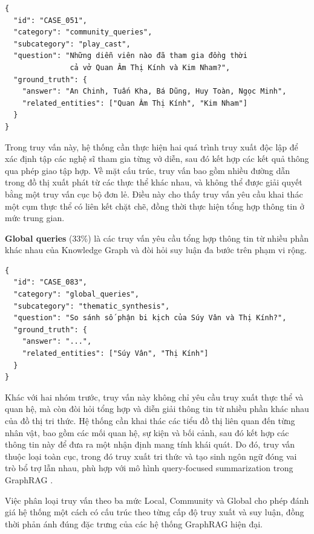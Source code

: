 \begin{tcolorbox}[colback=gray!5, colframe=black!50, arc=4pt, boxrule=0.5pt]
{\small
\begin{verbatim}
{
  "id": "CASE_051",
  "category": "community_queries",
  "subcategory": "play_cast",
  "question": "Những diễn viên nào đã tham gia đồng thời 
               cả vở Quan Âm Thị Kính và Kim Nham?",
  "ground_truth": {
    "answer": "An Chinh, Tuấn Kha, Bá Dũng, Huy Toàn, Ngọc Minh",
    "related_entities": ["Quan Âm Thị Kính", "Kim Nham"]
  }
}
\end{verbatim}
}
\end{tcolorbox}
Trong truy vấn này, hệ thống cần thực hiện hai quá trình truy xuất độc lập để xác định tập các nghệ sĩ tham gia từng vở diễn, sau đó kết hợp các kết quả thông qua phép giao tập hợp. Về mặt cấu trúc, truy vấn bao gồm nhiều đường dẫn trong đồ thị xuất phát từ các thực thể khác nhau, và không thể được giải quyết bằng một truy vấn cục bộ đơn lẻ. Điều này cho thấy truy vấn yêu cầu khai thác một cụm thực thể có liên kết chặt chẽ, đồng thời thực hiện tổng hợp thông tin ở mức trung gian.

\textbf{Global queries} (33\%) là các truy vấn yêu cầu tổng hợp thông tin từ nhiều phần khác nhau của Knowledge Graph và đòi hỏi suy luận đa bước trên phạm vi rộng.

\begin{tcolorbox}[colback=gray!5, colframe=black!50, arc=4pt, boxrule=0.5pt]
{\small
\begin{verbatim}
{
  "id": "CASE_083",
  "category": "global_queries",
  "subcategory": "thematic_synthesis",
  "question": "So sánh số phận bi kịch của Súy Vân và Thị Kính?",
  "ground_truth": {
    "answer": "...",
    "related_entities": ["Súy Vân", "Thị Kính"]
  }
}
\end{verbatim}
}
\end{tcolorbox}

Khác với hai nhóm trước, truy vấn này không chỉ yêu cầu truy xuất thực thể và quan hệ, mà còn đòi hỏi tổng hợp và diễn giải thông tin từ nhiều phần khác nhau của đồ thị tri thức. Hệ thống cần khai thác các tiểu đồ thị liên quan đến từng nhân vật, bao gồm các mối quan hệ, sự kiện và bối cảnh, sau đó kết hợp các thông tin này để đưa ra một nhận định mang tính khái quát. Do đó, truy vấn thuộc loại toàn cục, trong đó truy xuất tri thức và tạo sinh ngôn ngữ đóng vai trò bổ trợ lẫn nhau, phù hợp với mô hình query-focused summarization trong GraphRAG \cite{edge2024graphrag}.

Việc phân loại truy vấn theo ba mức Local, Community và Global cho phép đánh giá hệ thống một cách có cấu trúc theo từng cấp độ truy xuất và suy luận, đồng thời phản ánh đúng đặc trưng của các hệ thống GraphRAG hiện đại.


